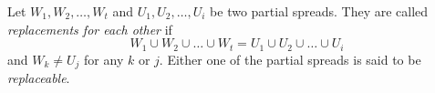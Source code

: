 Let $W_1, W_2, \dots, W_t$ and $U_1, U_2, \dots, U_i$ be two partial spreads. They are called \textit{replacements for each other} if
$$W_1 \cup W_2 \cup \dots \cup W_t = U_1 \cup U_2 \cup \dots \cup U_i$$
and $W_k \neq U_j$ for any $k$ or $j$. Either one of the partial spreads is said to be \textit{replaceable}.
